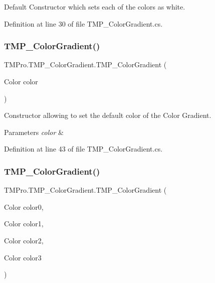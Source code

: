 Default Constructor which sets each of the colors as white. 



Definition at line 30 of file T\+M\+P\+\_\+\+Color\+Gradient.\+cs.

\mbox{\label{class_t_m_pro_1_1_t_m_p___color_gradient_ad8a5ef960c6adff7252e289593bbcbd2}} 
\subsubsection{\texorpdfstring{TMP\_ColorGradient()}{TMP\_ColorGradient()}\hspace{0.1cm}{\footnotesize\ttfamily [2/3]}}
{\footnotesize\ttfamily T\+M\+Pro.\+T\+M\+P\+\_\+\+Color\+Gradient.\+T\+M\+P\+\_\+\+Color\+Gradient (\begin{DoxyParamCaption}\item[{Color}]{color }\end{DoxyParamCaption})}



Constructor allowing to set the default color of the Color Gradient. 


\begin{DoxyParams}{Parameters}
{\em color} & \\
\hline
\end{DoxyParams}


Definition at line 43 of file T\+M\+P\+\_\+\+Color\+Gradient.\+cs.

\mbox{\label{class_t_m_pro_1_1_t_m_p___color_gradient_acfc78a5c6cb6511ef9f6b9c8c13d1748}} 
\subsubsection{\texorpdfstring{TMP\_ColorGradient()}{TMP\_ColorGradient()}\hspace{0.1cm}{\footnotesize\ttfamily [3/3]}}
{\footnotesize\ttfamily T\+M\+Pro.\+T\+M\+P\+\_\+\+Color\+Gradient.\+T\+M\+P\+\_\+\+Color\+Gradient (\begin{DoxyParamCaption}\item[{Color}]{color0,  }\item[{Color}]{color1,  }\item[{Color}]{color2,  }\item[{Color}]{color3 }\end{DoxyParamCaption})}



